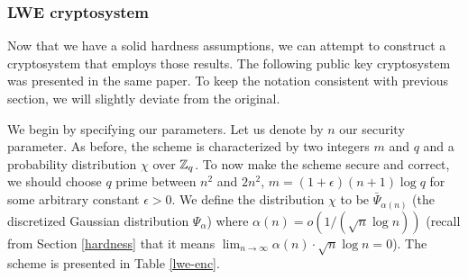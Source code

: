 

\subsubsection{LWE cryptosystem}
Now that we have a solid hardness assumptions, we can attempt to construct a cryptosystem that employs those results. The following public key cryptosystem was presented in the same paper. To keep the notation consistent with previous section, we will slightly deviate from the original.

We begin by specifying our parameters. Let us denote by $n$ our security parameter. As before, the scheme is characterized by two integers $m$ and $q$ and a probability distribution $\chi$ over $\mathbb{Z}_q$. To now make the scheme secure and correct, we should choose $q$ prime between $n^2$ and $2n^2$, $m = (1 + \epsilon)(n + 1) \log q$ for some arbitrary constant $\epsilon > 0$. We define the distribution $\chi$ to be $\bar{\Psi}_{\alpha (n)}$ (the discretized Gaussian distribution $\Psi_{\alpha}$) where $\alpha (n) = o(1/(\sqrt{n} \log n))$ (recall from Section \ref{hardness} that it means $\lim_{n\to\infty} \alpha (n) \cdot \sqrt{n} \log n = 0$). The scheme is presented in Table \ref{lwe-enc}.

